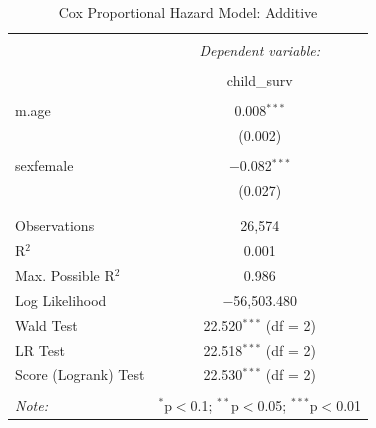 \documentclass[12pt,letterpaper]{article}
\begin{document}
\begin{table}[!htbp]
	\centering
	\caption{Cox Proportional Hazard Model: Additive} 
	\label{} 
	\begin{tabular}{@{\extracolsep{3pt}}lc} 
		\\[-1.8ex]\hline 
		\hline \\[-1.8ex] 
		& \multicolumn{1}{c}{\textit{Dependent variable:}} \\ 
		\cline{2-2} 
		\\[-1.8ex] & child\_surv \\ 
		\hline \\[-1.8ex] 
		m.age & 0.008$^{***}$ \\ 
		& (0.002) \\ 
		& \\ 
		sexfemale & $-$0.082$^{***}$ \\ 
		& (0.027) \\ 
		& \\ 
		\hline \\[-1.8ex] 
		Observations & 26,574 \\ 
		R$^{2}$ & 0.001 \\ 
		Max. Possible R$^{2}$ & 0.986 \\ 
		Log Likelihood & $-$56,503.480 \\ 
		Wald Test & 22.520$^{***}$ (df = 2) \\ 
		LR Test & 22.518$^{***}$ (df = 2) \\ 
		Score (Logrank) Test & 22.530$^{***}$ (df = 2) \\ 
		\hline 
		\hline \\[-1.8ex] 
		\textit{Note:}  & \multicolumn{1}{r}{$^{*}$p$<$0.1; $^{**}$p$<$0.05; $^{***}$p$<$0.01} \\ 
	\end{tabular} 
\end{table} 
\end{document}
